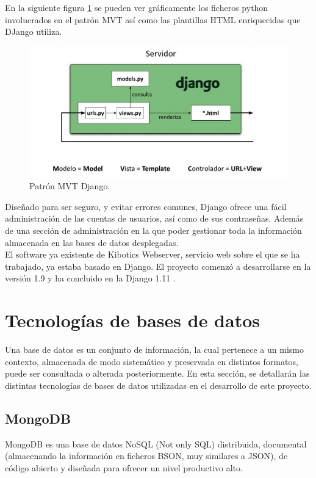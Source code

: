 \documentclass[a4paper, 12pt]{book}
\begin{document}
		En la siguiente figura \ref{fig:MTV_Django} se pueden ver gráficamente los ficheros python involucrados en el patrón MVT así como las plantillas HTML enriquecidas que DJango utiliza.
		\begin{figure}[H]
			\centering
			\includegraphics[width=13cm, keepaspectratio]{img/django_MTV.png}
			\caption{Patrón MVT Django.}
			\label{fig:MTV_Django}
		\end{figure}
		
		Diseñado para ser seguro, y evitar errores comunes, Django ofrece una fácil administración de las cuentas de usuarios, así como de sus contraseñas. Además de una sección de administración en la que poder gestionar toda la información almacenada en las bases de datos desplegadas.\\
		
		
		El software ya existente de Kibotics Webserver, servicio web sobre el que se ha trabajado, ya estaba basado en Django. El proyecto comenzó a desarrollarse en la versión 1.9 y ha concluido en la Django 1.11  \cite{Django}.
		
	
	\section{Tecnologías de bases de datos} 
	\label{sec:tecnologias_bases_de_datos} 
		Una base de datos es un conjunto de información, la cual pertenece a un mismo contexto, almacenada de modo sistemático y preservada en distintos formatos, puede ser consultada o alterada posteriormente. En esta sección, se detallarán las distintas tecnologías de bases de datos utilizadas en el desarrollo de este proyecto.
		
	\subsection{MongoDB}
	\label{subsec:mongodb}
		MongoDB \cite{MongoDB} es una base de datos NoSQL (Not only SQL) distribuida, documental (almacenando la información en ficheros BSON, muy similares a JSON), de código abierto y diseñada para ofrecer un nivel productivo alto.\\
		
\end{document}
